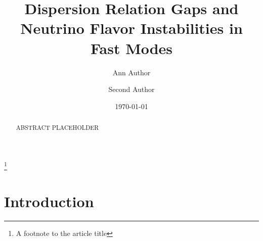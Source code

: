 \documentclass[%
preprint,
 amsmath,amssymb,
 aps,
 prd
]{revtex4-1}
\begin{document}

\title{Dispersion Relation Gaps and Neutrino Flavor Instabilities in Fast Modes}%
\thanks{A footnote to the article title}%

\author{Ann Author}
\author{Second Author}%
%


\date{\today}%

\begin{abstract}

ABSTRACT PLACEHOLDER


\end{abstract}

\maketitle




\section{\label{sec-introduction}Introduction}
\end{document}
